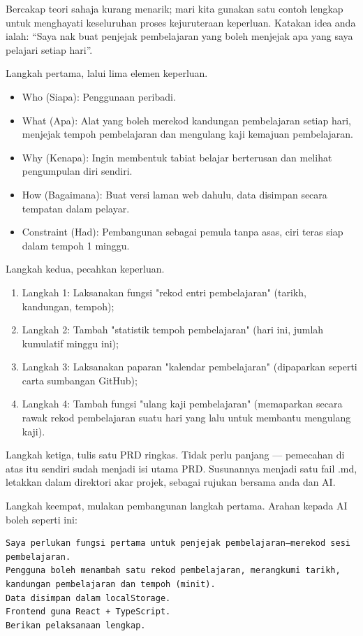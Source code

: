 Bercakap teori sahaja kurang menarik; mari kita gunakan satu contoh lengkap untuk menghayati keseluruhan proses kejuruteraan keperluan. Katakan idea anda ialah: “Saya nak buat penjejak pembelajaran yang boleh menjejak apa yang saya pelajari setiap hari”.

Langkah pertama, lalui lima elemen keperluan.

\begin{itemize}
  \item Who (Siapa): Penggunaan peribadi.
  \item What (Apa): Alat yang boleh merekod kandungan pembelajaran setiap hari, menjejak tempoh pembelajaran dan mengulang kaji kemajuan pembelajaran.
  \item Why (Kenapa): Ingin membentuk tabiat belajar berterusan dan melihat pengumpulan diri sendiri.
  \item How (Bagaimana): Buat versi laman web dahulu, data disimpan secara tempatan dalam pelayar.
  \item Constraint (Had): Pembangunan sebagai pemula tanpa asas, ciri teras siap dalam tempoh 1 minggu.
\end{itemize}

Langkah kedua, pecahkan keperluan.

\begin{enumerate}
  \item Langkah 1: Laksanakan fungsi "rekod entri pembelajaran" (tarikh, kandungan, tempoh);
  \item Langkah 2: Tambah "statistik tempoh pembelajaran" (hari ini, jumlah kumulatif minggu ini);
  \item Langkah 3: Laksanakan paparan "kalendar pembelajaran" (dipaparkan seperti carta sumbangan GitHub);
  \item Langkah 4: Tambah fungsi "ulang kaji pembelajaran" (memaparkan secara rawak rekod pembelajaran suatu hari yang lalu untuk membantu mengulang kaji).
\end{enumerate}

Langkah ketiga, tulis satu PRD ringkas. Tidak perlu panjang — pemecahan di atas itu sendiri sudah menjadi isi utama PRD. Susunannya menjadi satu fail .md, letakkan dalam direktori akar projek, sebagai rujukan bersama anda dan AI.

Langkah keempat, mulakan pembangunan langkah pertama. Arahan kepada AI boleh seperti ini:

\begin{lstlisting}
Saya perlukan fungsi pertama untuk penjejak pembelajaran—merekod sesi pembelajaran.
Pengguna boleh menambah satu rekod pembelajaran, merangkumi tarikh, kandungan pembelajaran dan tempoh (minit).
Data disimpan dalam localStorage.
Frontend guna React + TypeScript.
Berikan pelaksanaan lengkap.
\end{lstlisting}


